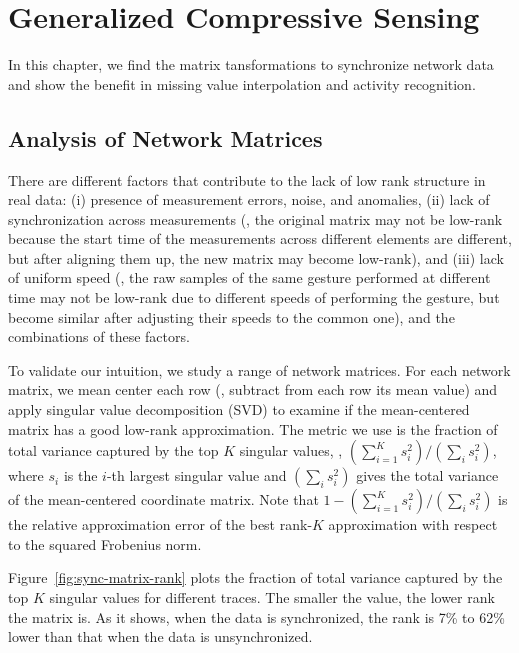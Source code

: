 \chapter{Generalized Compressive Sensing}
\label{chp:generalized-cs}

In this chapter, we find the matrix tansformations to synchronize network data and show the benefit in missing value interpolation and activity recognition.

\section{Analysis of Network Matrices}

There are different factors that contribute to the lack of low rank structure in real data: (i) presence of measurement errors, noise, and anomalies, (ii) lack of synchronization across measurements (\eg, the original matrix may not be low-rank because the start time of the measurements across different elements are different, but after aligning them up, the new matrix may become low-rank), and (iii) lack of uniform speed (\eg, the raw samples of the same gesture performed at different time may not be low-rank due to different speeds of performing the gesture, but become similar after adjusting their speeds to the common one), and the combinations of these factors.

To validate our intuition, we study a range of network matrices. 
For each network matrix, we mean center each row (\ie, subtract from
each row its mean value) and apply singular value decomposition
(SVD) to examine if the mean-centered matrix has a good low-rank
approximation.  The metric we use is the fraction of total variance
captured by the top $K$ singular values, \ie, $\left({\sum_{i=1}^{K}
  s_i^2}\right)/\left({\sum_{i} s_i^2}\right)$, where $s_i$ is the
$i$-th largest singular value and $\left({\sum_{i} s_i^2}\right)$
gives the total variance of the mean-centered coordinate matrix.  Note
that $1 - \left({\sum_{i=1}^{K} s_i^2}\right)/\left({\sum_{i}
  s_i^2}\right)$ is the relative approximation error of the best
rank-$K$ approximation with respect to the squared Frobenius norm.

Figure~\ref{fig:sync-matrix-rank} plots the fraction of total
variance captured by the top $K$ singular values for different
traces. The smaller the value, the lower rank the matrix is.
As it shows, when the data is synchronized, the rank is 
7\% to 62\% lower than that when the data is unsynchronized.

